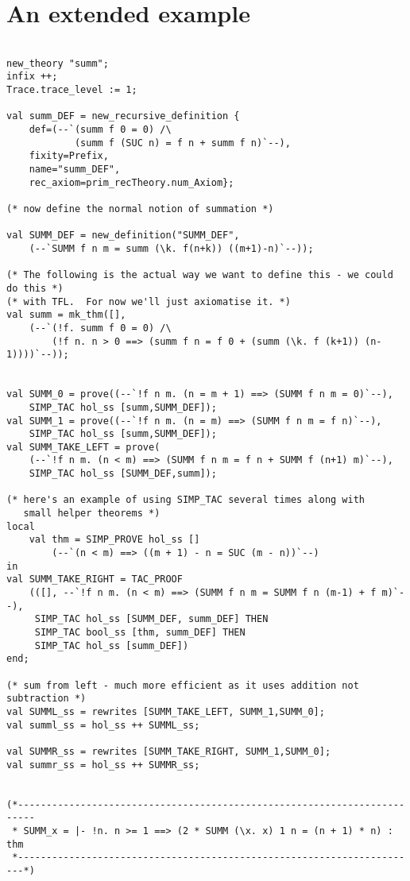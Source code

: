 \section{An extended example}
\label{extended-example}

\begin{verbatim}

new_theory "summ";
infix ++;
Trace.trace_level := 1;

val summ_DEF = new_recursive_definition {
    def=(--`(summ f 0 = 0) /\
            (summ f (SUC n) = f n + summ f n)`--),
    fixity=Prefix,
    name="summ_DEF",
    rec_axiom=prim_recTheory.num_Axiom};

(* now define the normal notion of summation *)

val SUMM_DEF = new_definition("SUMM_DEF",
    (--`SUMM f n m = summ (\k. f(n+k)) ((m+1)-n)`--));

(* The following is the actual way we want to define this - we could do this *)
(* with TFL.  For now we'll just axiomatise it. *)
val summ = mk_thm([],
    (--`(!f. summ f 0 = 0) /\
        (!f n. n > 0 ==> (summ f n = f 0 + (summ (\k. f (k+1)) (n-1))))`--));


val SUMM_0 = prove((--`!f n m. (n = m + 1) ==> (SUMM f n m = 0)`--),
    SIMP_TAC hol_ss [summ,SUMM_DEF]);
val SUMM_1 = prove((--`!f n m. (n = m) ==> (SUMM f n m = f n)`--),
    SIMP_TAC hol_ss [summ,SUMM_DEF]);
val SUMM_TAKE_LEFT = prove(
    (--`!f n m. (n < m) ==> (SUMM f n m = f n + SUMM f (n+1) m)`--),
    SIMP_TAC hol_ss [SUMM_DEF,summ]);

(* here's an example of using SIMP_TAC several times along with
   small helper theorems *)
local
    val thm = SIMP_PROVE hol_ss []
        (--`(n < m) ==> ((m + 1) - n = SUC (m - n))`--)
in
val SUMM_TAKE_RIGHT = TAC_PROOF
    (([], --`!f n m. (n < m) ==> (SUMM f n m = SUMM f n (m-1) + f m)`--),
     SIMP_TAC hol_ss [SUMM_DEF, summ_DEF] THEN
     SIMP_TAC bool_ss [thm, summ_DEF] THEN
     SIMP_TAC hol_ss [summ_DEF])
end;

(* sum from left - much more efficient as it uses addition not subtraction *)
val SUMML_ss = rewrites [SUMM_TAKE_LEFT, SUMM_1,SUMM_0];
val summl_ss = hol_ss ++ SUMML_ss;

val SUMMR_ss = rewrites [SUMM_TAKE_RIGHT, SUMM_1,SUMM_0];
val summr_ss = hol_ss ++ SUMMR_ss;


(*-------------------------------------------------------------------------
 * SUMM_x = |- !n. n >= 1 ==> (2 * SUMM (\x. x) 1 n = (n + 1) * n) : thm
 *-----------------------------------------------------------------------*)


\end{verbatim}

